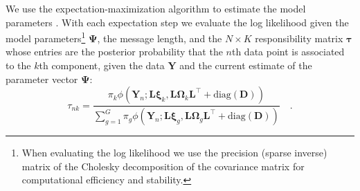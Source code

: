 \documentclass[twocolumn]{aastex62}
\newcommand{\vect}[1]{\boldsymbol{\mathbf{#1}}}
\renewcommand{\vec}[1]{\vect{#1}}
\newcommand{\weight}{\pi}
\newcommand{\data}{\textbf{Y}}
\newcommand{\vecdata}{\vec\data}
\newcommand{\diag}[1]{\textrm{diag}(#1)}
\newcommand{\transpose}{^\intercal}
\newcommand{\factorloads}{\textbf{L}}
\newcommand{\specificvariance}{\vec{D}}
\newcommand{\scoremeans}{\vec\xi}
\newcommand{\scorecovs}{\vec\Omega}
\newcommand{\NumData}{N}
\newcommand{\numdata}{n}
\newcommand{\NumComponents}{K}
\newcommand{\numcomponents}{k}
\begin{document}
We use the expectation-maximization algorithm to estimate the model parameters
\citep{Dempster:1977}. With each expectation step we evaluate the log likelihood 
given the model parameters\footnote{When evaluating the log likelihood we use the precision (sparse inverse) matrix of the Cholesky decomposition of the covariance matrix for computational efficiency and stability.} $\vec\Psi$, the message length, and the $\NumData \times \NumComponents$ responsibility 
matrix $\vec\tau$ whose entries are the posterior probability that the 
$\numdata$th data point is associated to the $\numcomponents$th component, given 
the data $\vecdata$ and the current estimate of the parameter vector $\vec\Psi$:
\begin{equation}
	\tau_{\numdata\numcomponents} = \frac{\weight_\numcomponents\phi(\vecdata_\numdata;\factorloads\scoremeans_\numcomponents, \factorloads\scorecovs_\numcomponents\factorloads\transpose + \diag{\specificvariance})}{\sum_{g=1}^{G}\weight_g\phi(\vecdata_\numdata;\factorloads\scoremeans_g, \factorloads\scorecovs_g\factorloads\transpose + \diag{\specificvariance})} \quad .
\end{equation}
\end{document}
